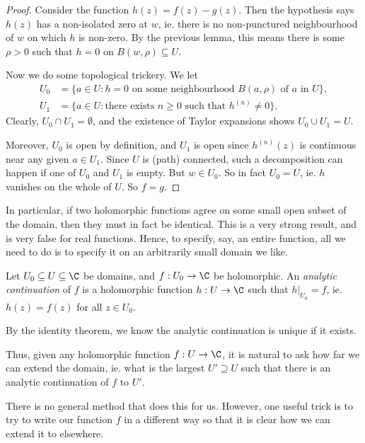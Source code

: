 \documentclass[a4paper]{article}
\begin{document}
\begin{proof}
  Consider the function $h(z) = f(z) - g(z)$. Then the hypothesis says $h(z)$ has a non-isolated zero at $w$, ie. there is no non-punctured neighbourhood of $w$ on which $h$ is non-zero. By the previous lemma, this means there is some $\rho > 0$ such that $h = 0$ on $B(w, \rho) \subseteq U$.

  Now we do some topological trickery. We let
  \begin{align*}
    U_0 &= \{a \in U: h = 0\text{ on some neighbourhood }B(a, \rho)\text{ of }a\text{ in }U\},\\
    U_1 &= \{a \in U: \text{there exists }n \geq 0\text{ such that }h^{(n)} \not= 0\}.
  \end{align*}
  Clearly, $U_0 \cap U_1 = \emptyset$, and the existence of Taylor expansions shows $U_0 \cup U_1 = U$.

  Moreover, $U_0$ is open by definition, and $U_1$ is open since $h^{(n)}(z)$ is continuous near any given $a \in U_1$. Since $U$ is (path) connected, such a decomposition can happen if one of $U_0$ and $U_1$ is empty. But $w \in U_0$. So in fact $U_0 = U$, ie. $h$ vanishes on the whole of $U$. So $f = g$.
\end{proof}

In particular, if two holomorphic functions agree on some small open subset of the domain, then they must in fact be identical. This is a very strong result, and is very false for real functions. Hence, to specify, say, an entire function, all we need to do is to specify it on an arbitrarily small domain we like.

\begin{defi}
  Let $U_0\subseteq U \subseteq \C$ be domains, and $f: U_0 \to \C$ be holomorphic. An \emph{analytic continuation} of $f$ is a holomorphic function $h:U \to \C$ such that $h|_{U_0} = f$, ie. $h(z) = f(z)$ for all $z \in U_0$.
\end{defi}
By the identity theorem, we know the analytic continuation is unique if it exists.

Thus, given any holomorphic function $f: U \to \C$, it is natural to ask how far we can extend the domain, ie. what is the largest $U' \supseteq U$ such that there is an analytic continuation of $f$ to $U'$.

There is no general method that does this for us. However, one useful trick is to try to write our function $f$ in a different way so that it is clear how we can extend it to elsewhere.
\end{document}
